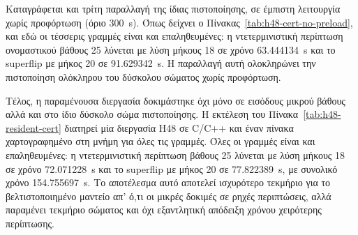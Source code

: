 \begin{table}[htbp]\centering
\resizebox{\textwidth}{!}{}
\caption[Πιστοποίηση του μαντείου H48 σε έμπιστη λειτουργία με προφόρτωση]{Πιστοποίηση του μαντείου () H48 σε έμπιστη λειτουργία με προφόρτωση (όριο 180~s): 4/4 , με τη γραμμή του superflip σε 158.440286~s. Πηγή: .}
\label{tab:h48-cert-preload}
\end{table}

Καταγράφεται και τρίτη παραλλαγή της ίδιας πιστοποίησης, σε έμπιστη λειτουργία χωρίς προφόρτωση (όριο 300~s). Όπως δείχνει ο Πίνακας~\ref{tab:h48-cert-no-preload}, και εδώ οι τέσσερις γραμμές είναι  και επαληθευμένες: η ντετερμινιστική περίπτωση ονομαστικού βάθους 25 λύνεται με λύση μήκους 18 σε χρόνο 63.444134~s και το superflip με μήκος 20 σε 91.629342~s. Η παραλλαγή αυτή ολοκληρώνει την πιστοποίηση ολόκληρου του δύσκολου σώματος χωρίς προφόρτωση.

\begin{table}[htbp]\centering
\resizebox{\textwidth}{!}{}
\caption[Πιστοποίηση του μαντείου H48 σε έμπιστη λειτουργία χωρίς προφόρτωση]{Πιστοποίηση του μαντείου H48 σε έμπιστη λειτουργία χωρίς προφόρτωση (όριο 300~s): 4/4 , με μέγιστο χρόνο 91.629342~s για το superflip. Πηγή: .}
\label{tab:h48-cert-no-preload}
\end{table}

Τέλος, η παραμένουσα διεργασία δοκιμάστηκε όχι μόνο σε εισόδους μικρού βάθους αλλά και στο ίδιο δύσκολο σώμα πιστοποίησης. Η εκτέλεση του Πίνακα~\ref{tab:h48-resident-cert} διατηρεί μία διεργασία H48 σε C/C++ και έναν πίνακα  χαρτογραφημένο στη μνήμη για όλες τις γραμμές. Όλες οι γραμμές είναι  και επαληθευμένες: η ντετερμινιστική περίπτωση βάθους 25 λύνεται με λύση μήκους 18 σε χρόνο 72.071228~s και το superflip με μήκος 20 σε 77.822389~s, με συνολικό χρόνο 154.755697~s. Το αποτέλεσμα αυτό αποτελεί ισχυρότερο τεκμήριο για το βελτιστοποιημένο μαντείο απ' ό,τι οι μικρές δοκιμές σε ρηχές περιπτώσεις, αλλά παραμένει τεκμήριο σώματος και όχι εξαντλητική απόδειξη χρόνου χειρότερης περίπτωσης.

\begin{table}[htbp]\centering
\resizebox{\textwidth}{!}{}
\caption[Πιστοποίηση του δύσκολου σώματος μέσω παραμένουσας διεργασίας]{Πιστοποίηση του δύσκολου σώματος μέσω παραμένουσας διεργασίας σε C/C++ με έμπιστο πίνακα  (όριο 240~s): 4/4 , με το superflip σε 77.822389~s. Πηγή: .}
\label{tab:h48-resident-cert}
\end{table}

